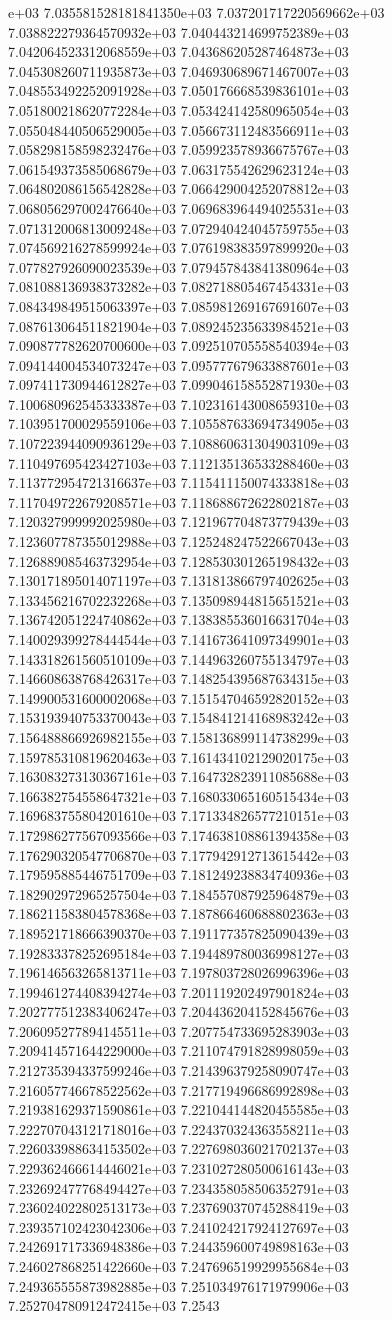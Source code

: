 e+03	7.035581528181841350e+03	7.037201717220569662e+03	7.038822279364570932e+03	7.040443214699752389e+03	7.042064523312068559e+03	7.043686205287464873e+03	7.045308260711935873e+03	7.046930689671467007e+03	7.048553492252091928e+03	7.050176668539836101e+03	7.051800218620772284e+03	7.053424142580965054e+03	7.055048440506529005e+03	7.056673112483566911e+03	7.058298158598232476e+03	7.059923578936675767e+03	7.061549373585068679e+03	7.063175542629623124e+03	7.064802086156542828e+03	7.066429004252078812e+03	7.068056297002476640e+03	7.069683964494025531e+03	7.071312006813009248e+03	7.072940424045759755e+03	7.074569216278599924e+03	7.076198383597899920e+03	7.077827926090023539e+03	7.079457843841380964e+03	7.081088136938373282e+03	7.082718805467454331e+03	7.084349849515063397e+03	7.085981269167691607e+03	7.087613064511821904e+03	7.089245235633984521e+03	7.090877782620700600e+03	7.092510705558540394e+03	7.094144004534073247e+03	7.095777679633887601e+03	7.097411730944612827e+03	7.099046158552871930e+03	7.100680962545333387e+03	7.102316143008659310e+03	7.103951700029559106e+03	7.105587633694734905e+03	7.107223944090936129e+03	7.108860631304903109e+03	7.110497695423427103e+03	7.112135136533288460e+03	7.113772954721316637e+03	7.115411150074333818e+03	7.117049722679208571e+03	7.118688672622802187e+03	7.120327999992025980e+03	7.121967704873779439e+03	7.123607787355012988e+03	7.125248247522667043e+03	7.126889085463732954e+03	7.128530301265198432e+03	7.130171895014071197e+03	7.131813866797402625e+03	7.133456216702232268e+03	7.135098944815651521e+03	7.136742051224740862e+03	7.138385536016631704e+03	7.140029399278444544e+03	7.141673641097349901e+03	7.143318261560510109e+03	7.144963260755134797e+03	7.146608638768426317e+03	7.148254395687634315e+03	7.149900531600002068e+03	7.151547046592820152e+03	7.153193940753370043e+03	7.154841214168983242e+03	7.156488866926982155e+03	7.158136899114738299e+03	7.159785310819620463e+03	7.161434102129020175e+03	7.163083273130367161e+03	7.164732823911085688e+03	7.166382754558647321e+03	7.168033065160515434e+03	7.169683755804201610e+03	7.171334826577210151e+03	7.172986277567093566e+03	7.174638108861394358e+03	7.176290320547706870e+03	7.177942912713615442e+03	7.179595885446751709e+03	7.181249238834740936e+03	7.182902972965257504e+03	7.184557087925964879e+03	7.186211583804578368e+03	7.187866460688802363e+03	7.189521718666390370e+03	7.191177357825090439e+03	7.192833378252695184e+03	7.194489780036998127e+03	7.196146563265813711e+03	7.197803728026996396e+03	7.199461274408394274e+03	7.201119202497901824e+03	7.202777512383406247e+03	7.204436204152845676e+03	7.206095277894145511e+03	7.207754733695283903e+03	7.209414571644229000e+03	7.211074791828998059e+03	7.212735394337599246e+03	7.214396379258090747e+03	7.216057746678522562e+03	7.217719496686992898e+03	7.219381629371590861e+03	7.221044144820455585e+03	7.222707043121718016e+03	7.224370324363558211e+03	7.226033988634153502e+03	7.227698036021702137e+03	7.229362466614446021e+03	7.231027280500616143e+03	7.232692477768494427e+03	7.234358058506352791e+03	7.236024022802513173e+03	7.237690370745288419e+03	7.239357102423042306e+03	7.241024217924127697e+03	7.242691717336948386e+03	7.244359600749898163e+03	7.246027868251422660e+03	7.247696519929955684e+03	7.249365555873982885e+03	7.251034976171979906e+03	7.252704780912472415e+03	7.2543